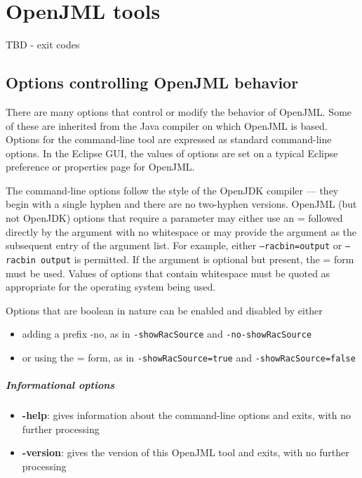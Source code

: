 
\chapter{OpenJML tools}

TBD - exit codes

\section{Options controlling OpenJML behavior}
There are many options that control or modify the behavior of OpenJML. Some of these are inherited from the Java compiler on 
which OpenJML is based. Options for the command-line tool are expressed as standard command-line options. In the Eclipse GUI, the values of options are set on a typical Eclipse preference or properties page for OpenJML.

The command-line options follow the style of the OpenJDK compiler --- they begin 
with a single hyphen and there are no two-hyphen versions.
OpenJML (but not OpenJDK) options that require a parameter may either use an = followed directly by the argument with no whitespace or 
may provide the argument as the subsequent entry of the argument list. 
For example, either \texttt{--racbin=output} or
\texttt{--racbin output} is permitted. If the argument is optional 
but present, the = form must be used. Values of options that contain whitespace must be quoted as appropriate for the operating system being used.

Options that are boolean in nature can be enabled and disabled by either
\begin{itemize}[noitemsep,nolistsep]
\item adding a prefix -no, as in \texttt{-showRacSource} and \texttt{-no-showRacSource}
\item or using the = form, as in \texttt{-showRacSource=true} and \texttt{-showRacSource=false}
\end{itemize}

\paragraph{Informational options}
\begin{itemize}[noitemsep,nolistsep]
\item \textbf{-help}: gives information about the command-line options and exits, with no further processing
\item \textbf{-version}: gives the version of this OpenJML tool and exits, with no further processing
\end{itemize}


